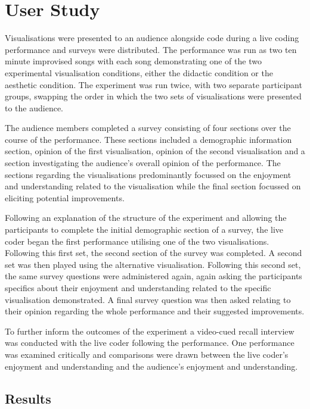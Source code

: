 \documentclass{sig-alternate}
\begin{document}
\section{User Study}

Visualisations were presented to an audience alongside code during a live coding performance and surveys were distributed. The performance was run as two ten minute improvised songs with each song demonstrating one of the two experimental visualisation conditions, either the didactic condition or the aesthetic condition. The experiment was run twice, with two separate participant groups, swapping the order in which the two sets of visualisations were presented to the audience.

The audience members completed a survey consisting of four sections over the course of the performance. These sections included a demographic information section, opinion of the first visualisation, opinion of the second visualisation and a section investigating the audience's overall opinion of the performance. The sections regarding the visualisations predominantly focussed on the enjoyment and understanding related to the visualisation while the final section focussed on eliciting potential improvements.

Following an explanation of the structure of the experiment and allowing the participants to complete the initial demographic section of a survey, the live coder began the first performance utilising one of the two visualisations. Following this first set, the second section of the survey was completed. A second set was then played using the alternative visualisation. Following this second set, the same survey questions were administered again, again asking the participants specifics about their enjoyment and understanding related to the specific visualisation demonstrated. A final survey question was then asked relating to their opinion regarding the whole performance and their suggested improvements.

To further inform the outcomes of the experiment a video-cued recall interview was conducted with the live coder following the performance. One performance was examined critically and comparisons were drawn between the live coder's enjoyment and understanding and the audience's enjoyment and understanding.

\subsection{Results}
\end{document}
